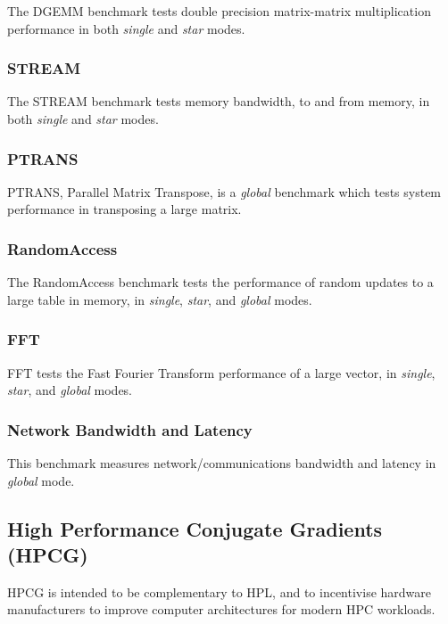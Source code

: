The DGEMM benchmark tests double precision matrix-matrix multiplication performance in both \emph{single} and \emph{star} modes.

 
%
%
\subsubsection{STREAM}

The STREAM benchmark tests memory bandwidth, to and from memory, in both \emph{single} and \emph{star} modes.


%
%
\subsubsection{PTRANS}

PTRANS, Parallel Matrix Transpose, is a \emph{global} benchmark which tests system performance in transposing a large matrix.


%
%
\subsubsection{RandomAccess}

The RandomAccess benchmark tests the performance of random updates to a large table in memory, in \emph{single}, \emph{star}, and \emph{global} modes.


%
%
\subsubsection{FFT}

FFT tests the Fast Fourier Transform performance of a large vector, in \emph{single}, \emph{star}, and \emph{global} modes.


%
%
\subsubsection{Network Bandwidth and Latency}

This benchmark measures network/communications bandwidth and latency in \emph{global} mode.


%
%
\subsection{High Performance Conjugate Gradients (HPCG)}

HPCG is intended to be complementary to HPL, and to incentivise hardware manufacturers to improve computer architectures for modern HPC workloads. 

